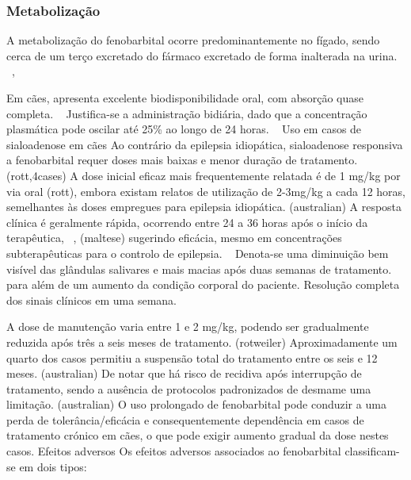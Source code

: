 \subsubsection{Metabolização}


A metabolização do fenobarbital ocorre predominantemente no fígado, sendo cerca de um terço excretado do fármaco excretado de forma inalterada na urina. ~\cite{Trinka2023},~\cite{Podell2016}


Em cães, apresenta excelente biodisponibilidade oral, com absorção quase completa. ~\cite{Jukier2023} Justifica-se a administração bidiária, dado que a concentração plasmática pode oscilar até 25\% ao longo de 24 horas. ~\cite{Jukier2023}
Uso em casos de sialoadenose em cães
Ao contrário da epilepsia idiopática, sialoadenose responsiva a fenobarbital requer doses mais baixas e menor duração de tratamento. (rott,4cases) A dose inicial eficaz mais frequentemente relatada é de 1 mg/kg por via oral (rott), embora existam relatos de utilização de 2-3mg/kg a cada 12 horas, semelhantes às doses empregues para epilepsia idiopática.  (australian) 
A resposta clínica é geralmente rápida, ocorrendo entre 24 a 36 horas após o início da terapêutica, ~\cite{boydell_sialadenosis_2000}, (maltese) sugerindo eficácia, mesmo em concentrações subterapêuticas para o controlo de epilepsia. ~\cite{boydell_sialadenosis_2000} Denota-se uma diminuição bem visível das glândulas salivares e mais macias após duas semanas de tratamento. para além de um aumento da condição corporal do paciente. Resolução completa dos sinais clínicos em uma semana.


A dose de manutenção varia entre 1 e 2 mg/kg, podendo ser gradualmente reduzida após três a seis meses de tratamento. (rotweiler) Aproximadamente um quarto dos casos permitiu a suspensão total do tratamento entre os seis e 12 meses. (australian)
De notar que há risco de recidiva após interrupção de tratamento, sendo a ausência de protocolos padronizados de desmame uma limitação. (australian) O uso prolongado de fenobarbital pode conduzir a uma perda de tolerância/eficácia e consequentemente dependência em casos de tratamento crónico em cães, o que pode exigir aumento gradual da dose nestes casos. 
Efeitos adversos
Os efeitos adversos associados ao fenobarbital classificam-se em dois tipos: ~\cite{Bersan2014}~\cite{Walton-Clark2022}

